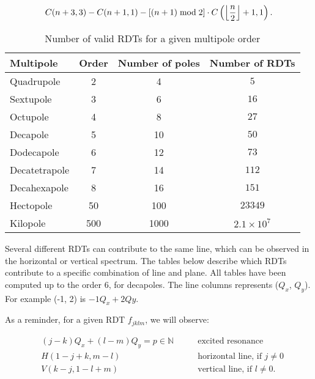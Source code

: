 \begin{equation}
    C(n+3, 3) - C(n+1,1) - \left[(n+1) \;\mathrm{mod}\; 2\right] \cdot C\left(\floor*{\frac{n}{2}}+1, 1\right).
    \label{eq:number_rdts}
\end{equation}

\begin{table}[H]
  \centering
  \begin{tabular}{lccc}
  Multipole     & Order & Number of poles & Number of RDTs             \\
  \hline
  Quadrupole    & 2     & 4    & $5  $                                 \\ 
  Sextupole     & 3     & 6    & $16  $                                \\ 
  Octupole      & 4     & 8    & $27  $                                \\ 
  Decapole      & 5     & 10   & $50  $                                \\ 
  Dodecapole    & 6     & 12   & $73  $                                \\ 
  Decatetrapole & 7     & 14   & $112  $                               \\ 
  Decahexapole  & 8     & 16   & $151  $                               \\ 
  Hectopole     & 50    & 100  & $23349  $                             \\
  Kilopole      & 500   & 1000 & $2.1 \times 10^7$ \\ \hline
  \end{tabular}
  \caption{Number of valid RDTs for a given multipole order}
  \label{table:appendix:number_rdts}
\end{table}


Several different RDTs can contribute to the same line, which can be observed in the horizontal or vertical spectrum. The tables below describe which RDTs contribute to a specific combination of line and plane.
All tables have been computed up to the order 6, for decapoles.
The line columns represents ($Q_x$, $Q_y$). For example (-1, 2) is \(-1Q_x + 2Qy\).

As a reminder, for a given RDT $f_{jklm}$, we will observe:

\begin{equation}\begin{aligned}
& (j-k)Q_x + (l-m)Q_y = p \in \mathbb{N} \quad\quad& \mbox{excited resonance}\\
& H(1 - j + k, m - l) \quad\quad& \mbox{horizontal line, if } j \ne 0 \\
& V(k - j, 1 - l + m) \quad\quad& \mbox{vertical line, if } l \ne 0. \\
\end{aligned}
\label{eq:reminder_rdt}
\end{equation}

